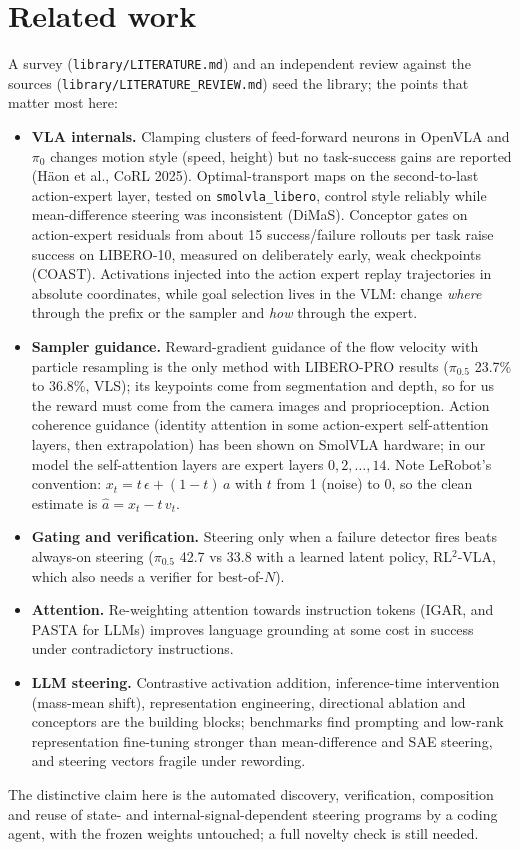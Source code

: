 \documentclass[11pt]{article}
\begin{document}
\section{Related work}
A survey (\texttt{library/LITERATURE.md}) and an independent review against the sources (\texttt{library/LITERATURE\_REVIEW.md})
seed the library; the points that matter most here:
\begin{itemize}
\item \textbf{VLA internals.} Clamping clusters of feed-forward neurons in OpenVLA and $\pi_0$ changes motion style (speed,
height) but no task-success gains are reported (Häon et al., CoRL 2025). Optimal-transport maps on the second-to-last action-expert
layer, tested on \texttt{smolvla\_libero}, control style reliably while mean-difference steering was inconsistent (DiMaS).
Conceptor gates on action-expert residuals from about 15 success/failure rollouts per task raise success on LIBERO-10, measured on
deliberately early, weak checkpoints (COAST). Activations injected into the action expert replay trajectories in absolute
coordinates, while goal selection lives in the VLM: change \emph{where} through the prefix or the sampler and \emph{how} through
the expert.
\item \textbf{Sampler guidance.} Reward-gradient guidance of the flow velocity with particle resampling is the only method with
LIBERO-PRO results ($\pi_{0.5}$ 23.7\% to 36.8\%, VLS); its keypoints come from segmentation and depth, so for us the reward must
come from the camera images and proprioception. Action coherence guidance (identity attention in some action-expert self-attention
layers, then extrapolation) has been shown on SmolVLA hardware; in our model the self-attention layers are expert layers
$0,2,\dots,14$. Note LeRobot's convention: $x_t = t\,\epsilon + (1-t)\,a$ with $t$ from 1 (noise) to 0, so the clean estimate is
$\hat a = x_t - t\,v_t$.
\item \textbf{Gating and verification.} Steering only when a failure detector fires beats always-on steering ($\pi_{0.5}$ 42.7 vs
33.8 with a learned latent policy, RL$^2$-VLA, which also needs a verifier for best-of-$N$).
\item \textbf{Attention.} Re-weighting attention towards instruction tokens (IGAR, and PASTA for LLMs) improves language grounding
at some cost in success under contradictory instructions.
\item \textbf{LLM steering.} Contrastive activation addition, inference-time intervention (mass-mean shift), representation
engineering, directional ablation and conceptors are the building blocks; benchmarks find prompting and low-rank representation
fine-tuning stronger than mean-difference and SAE steering, and steering vectors fragile under rewording.
\end{itemize}
The distinctive claim here is the automated discovery, verification, composition and reuse of state- and internal-signal-dependent
steering programs by a coding agent, with the frozen weights untouched; a full novelty check is still needed.
\end{document}
